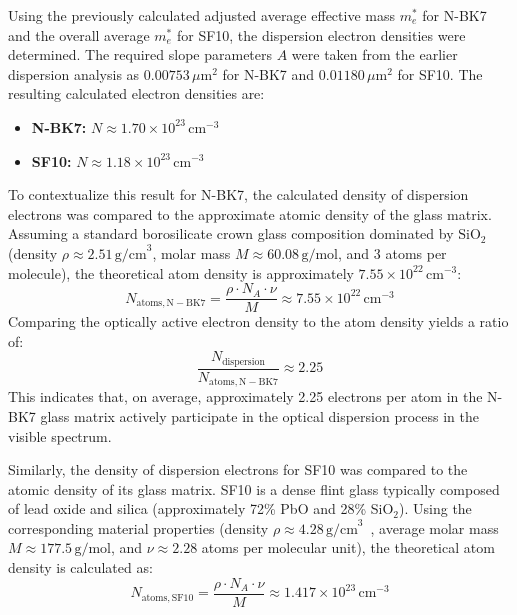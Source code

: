 \documentclass[a4paper]{article}
\begin{document}
Using the previously calculated adjusted average effective mass $m_e^*$ for N-BK7 and the overall average $m_e^*$ for SF10, the dispersion electron densities were determined. The required slope parameters $A$ were taken from the earlier dispersion analysis as $0.00753\,\mu\mathrm{m}^2$ for N-BK7 and $0.01180\,\mu\mathrm{m}^2$ for SF10. The resulting calculated electron densities are:
\begin{itemize}
  \item \textbf{N-BK7:} $N \approx 1.70 \times 10^{23}\,\mathrm{cm}^{-3}$
  \item \textbf{SF10:} $N \approx 1.18 \times 10^{23}\,\mathrm{cm}^{-3}$
\end{itemize}

To contextualize this result for N-BK7, the calculated density of dispersion electrons was compared to the approximate atomic density of the glass matrix. Assuming a standard borosilicate crown glass composition dominated by $\mathrm{SiO}_2$ (density $\rho \approx 2.51\,\mathrm{g/cm}^3$, molar mass $M \approx 60.08\,\mathrm{g/mol}$, and 3 atoms per molecule), the theoretical atom density is approximately $7.55 \times 10^{22}\,\mathrm{cm}^{-3}$:
\begin{equation}
  N_{\mathrm{atoms,N-BK7}} = \frac{\rho \cdot N_A \cdot \nu}{M} \approx 7.55 \times 10^{22}\,\mathrm{cm}^{-3}
\end{equation}
Comparing the optically active electron density to the atom density yields a ratio of:
\begin{equation}
  \frac{N_{\mathrm{dispersion}}}{N_{\mathrm{atoms,N-BK7}}} \approx 2.25
\end{equation}
This indicates that, on average, approximately 2.25 electrons per atom in the N-BK7 glass matrix actively participate in the optical dispersion process in the visible spectrum.

Similarly, the density of dispersion electrons for SF10 was compared to the atomic density of its glass matrix. SF10 is a dense flint glass typically composed of lead oxide and silica (approximately 72\% PbO and 28\% SiO$_2$). Using the corresponding material properties (density $\rho \approx 4.28\,\mathrm{g/cm}^3$~\cite{SchottSF10}, average molar mass $M \approx 177.5\,\mathrm{g/mol}$, and $\nu\approx2.28$ atoms per molecular unit), the theoretical atom density is calculated as:
\begin{equation}
  N_{\mathrm{atoms,SF10}} = \frac{\rho \cdot N_A \cdot \nu}{M} \approx 1.417 \times 10^{23}\,\mathrm{cm}^{-3}
\end{equation}
\end{document}
